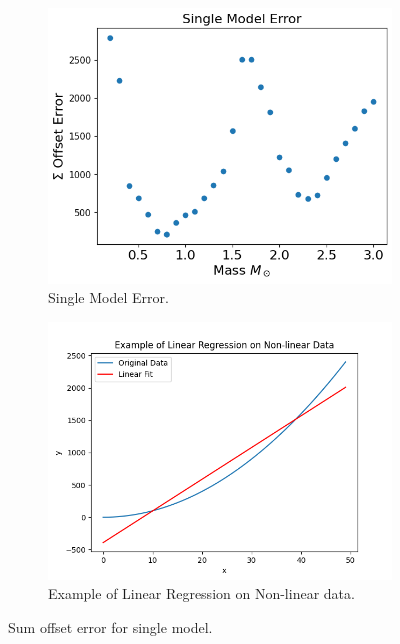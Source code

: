 \begin{figure}[H]
	\begin{subfigure}{\textwidth}
		\centering
		\includegraphics[width=\textwidth,height=0.5\textheight]{assets/singlemodeerror.png}
		\caption{Single Model Error.}
		\label{fig:sumerrorsinglea}
	\end{subfigure}
	\begin{subfigure}{\textwidth}
		\centering
		\includegraphics[width=\textwidth,height=0.5\textheight]{assets/Examplenonlinreg.png}
		\caption{Example of Linear Regression on Non-linear data.}
		\label{fig:sumerrorsingleb}
	\end{subfigure}
	\caption{Sum offset error for single model.}
	\label{fig:sumerrorsingle}
\end{figure}


